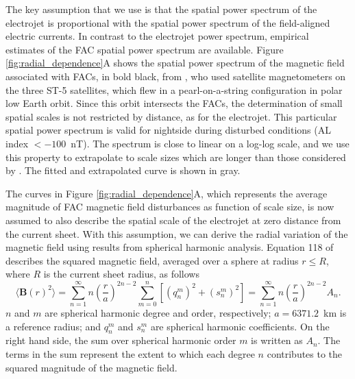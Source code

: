 \documentclass[draft]{agujournal2019}
\begin{document}
The key assumption that we use is that the spatial power spectrum of the electrojet is proportional with the spatial power spectrum of the field-aligned electric currents. In contrast to the electrojet power spectrum, empirical estimates of the FAC spatial power spectrum are available. Figure \ref{fig:radial_dependence}A shows the spatial power spectrum of the magnetic field associated with FACs, in bold black, from \cite{Gjerloev11}, who used satellite magnetometers on the three ST-5 satellites, which flew in a pearl-on-a-string configuration in polar low Earth orbit. Since this orbit intersects the FACs, the determination of small spatial scales is not restricted by distance, as for the electrojet. This particular spatial power spectrum is valid for nightside during disturbed conditions (AL index $<-100$~nT). The spectrum is close to linear on a log-log scale, and we use this property to extrapolate to scale sizes which are longer than those considered by \cite{Gjerloev11}. The fitted and extrapolated curve is shown in gray. 

The curves in Figure \ref{fig:radial_dependence}A, which represents the average magnitude of FAC magnetic field disturbances as function of scale size, is now assumed to also describe the spatial scale of the electrojet at zero distance from the current sheet. With this assumption, we can derive the radial variation of the magnetic field using results from spherical harmonic analysis. Equation 118 of \cite{Sabaka10} describes the squared magnetic field, averaged over a sphere at radius $r \le R$, where $R$ is the current sheet radius, as follows
\begin{equation}
\langle \mathbf{B}(r)^2\rangle = \sum_{n=1}^\infty n\left(\frac{r}{a}\right)^{2n-2}\sum_{m=0}^{n}[(q_n^m)^2 + (s_n^m)^2] = \sum_{n=1}^\infty n\left(\frac{r}{a}\right)^{2n-2}A_n. \label{eq:spectrum}
\end{equation}
$n$ and $m$ are spherical harmonic degree and order, respectively; $a=6371.2$~km is a reference radius; and $q_n^m$ and $s_n^m$ are spherical harmonic coefficients. On the right hand side, the sum over spherical harmonic order $m$ is written as $A_n$. The terms in the sum represent the extent to which each degree $n$ contributes to the squared magnitude of the magnetic field. 
\end{document}
